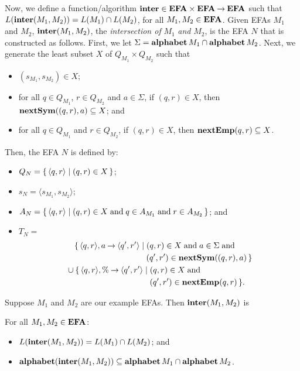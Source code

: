 Now, we define a function/algorithm
%
$\mathbf{inter}\in\mathbf{EFA}\times\mathbf{EFA}\mathbin{\to}\mathbf{EFA}$ such that
$L(\mathbf{inter}(M_1,M_2))=L(M_1)\cap L(M_2)$, for all $M_1,M_2\in\mathbf{EFA}$.
Given EFAs $M_1$ and $M_2$, $\mathbf{inter}(M_1,M_2)$, the \emph{intersection of}
$M_1$ \emph{and} $M_2$, is the EFA $N$ that is constructed as follows.
First, we let $\Sigma=\mathbf{alphabet}\,M_1\cap\mathbf{alphabet}\,M_2$.
Next, we generate the least subset $X$ of $Q_{M_1}\times Q_{M_2}$
such that
\begin{itemize}
\item $(s_{M_1},s_{M_2})\in X$;

\item for all $q\in Q_{M_1}$, $r\in Q_{M_2}$ and $a\in\Sigma$,
if $(q,r)\in X$, then $\mathbf{nextSym}((q,r),a)\subseteq X$; and

\item for all $q\in Q_{M_1}$ and $r\in Q_{M_2}$,
if $(q,r)\in X$, then $\mathbf{nextEmp}(q,r)\subseteq X$.
\end{itemize}
Then, the EFA $N$ is defined by:
\begin{itemize}
\item $Q_N=
\{ \, \langle q,r\rangle \mid (q,r)\in X \, \}$;

\item $s_N=\langle s_{M_1},s_{M_2}\rangle$;

\item $A_N=\{ \, \langle q,r\rangle \mid (q,r)\in X\;\allowbreak\mbox{and}\allowbreak\;
q\in A_{M_1}\;\allowbreak\mbox{and}\allowbreak\;r\in A_{M_2} \, \}$; and

\item $T_N={}$
  \begin{align*}
    &\quad \{\,\langle q,r\rangle,a\fun\langle
    q',r'\rangle\mid(q,r)\in X\eqtxt{and}
    a\in\Sigma\eqtxt{and}\\
    &\hspace{3.45cm}(q',r')\in\nextSym((q,r),a)\,\} \\
    &\cup
    \{\,\langle q,r\rangle,\%\fun\langle q',r'\rangle\mid(q,r)\in
    X\eqtxt{and} \\
    &\hspace{3.6cm}(q',r')\in\nextEmp(q,r)\,\}.
  \end{align*}
\end{itemize}

Suppose $M_1$ and $M_2$ are our example EFAs.
Then $\mathbf{inter}(M_1,M_2)$ is
\begin{center}

\end{center}

\begin{theorem}
For all $M_1,M_2\in\mathbf{EFA}$:
\begin{itemize}
\item $L(\mathbf{inter}(M_1,M_2))=L(M_1)\cap L(M_2)$; and

\item $\mathbf{alphabet}(\mathbf{inter}(M_1,M_2))\subseteq \mathbf{alphabet}\,M_1\cap\mathbf{alphabet}\,M_2$.
\end{itemize}
\end{theorem}

